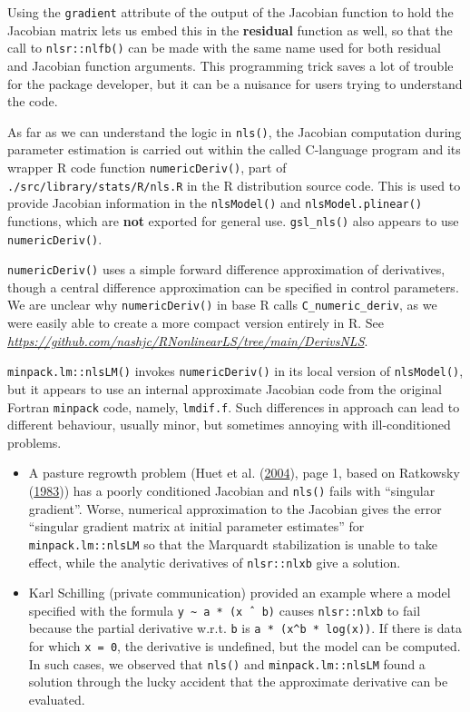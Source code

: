 Using the \texttt{gradient} attribute of the output of the Jacobian function to hold
the Jacobian matrix lets us embed this in the \textbf{residual} function as well,
so that the call to \texttt{nlsr::nlfb()} can be made with the same name used for
both residual and Jacobian function arguments. This programming trick saves a
lot of trouble for the package developer, but it can be a nuisance for users
trying to understand the code.

As far as we can understand the logic in \texttt{nls()}, the Jacobian computation during
parameter estimation is carried out within the called C-language program
and its wrapper R code function \texttt{numericDeriv()}, part of
\texttt{./src/library/stats/R/nls.R}
in the R distribution source code. This is used to provide Jacobian information in
the \texttt{nlsModel()} and \texttt{nlsModel.plinear()} functions, which are \textbf{not} exported for
general use. \texttt{gsl\_nls()} also appears to use \texttt{numericDeriv()}.

\texttt{numericDeriv()} uses a
simple forward difference approximation of derivatives, though a central
difference approximation can be specified in control parameters.
We are unclear why \texttt{numericDeriv()} in base R calls \texttt{C\_numeric\_deriv},
as we were easily able to create a more compact version entirely in R.
See \emph{\url{https://github.com/nashjc/RNonlinearLS/tree/main/DerivsNLS}}.

\texttt{minpack.lm::nlsLM()} invokes \texttt{numericDeriv()} in its local
version of \texttt{nlsModel()}, but it appears to use an internal approximate Jacobian
code from
the original Fortran \texttt{minpack} code, namely, \texttt{lmdif.f}. Such differences in approach
can lead to different behaviour, usually minor, but sometimes annoying with
ill-conditioned problems.

\begin{itemize}
\item
  A pasture regrowth problem (Huet et al. (\protect\hyperlink{ref-Huet2004}{2004}), page 1, based on Ratkowsky (\protect\hyperlink{ref-Ratkowsky1983}{1983})) has a
  poorly conditioned Jacobian and \texttt{nls()} fails with ``singular gradient''.
  Worse, numerical approximation to the Jacobian gives the error
  ``singular gradient matrix at initial parameter estimates'' for \texttt{minpack.lm::nlsLM}
  so that the Marquardt stabilization is unable to take effect, while the analytic
  derivatives of \texttt{nlsr::nlxb} give a solution.
\item
  Karl Schilling (private communication) provided an example where a model specified
  with the formula \texttt{y\ \textasciitilde{}\ a\ *\ (x\ ˆ\ b)} causes \texttt{nlsr::nlxb} to fail because the partial
  derivative w.r.t. \texttt{b} is \texttt{a\ *\ (x\^{}b\ *\ log(x))}. If there is data for which \texttt{x\ =\ 0},
  the derivative is undefined, but the model can be computed. In such cases,
  we observed that \texttt{nls()} and \texttt{minpack.lm::nlsLM} found a solution through the
  lucky accident that the approximate derivative can be evaluated.
\end{itemize}

